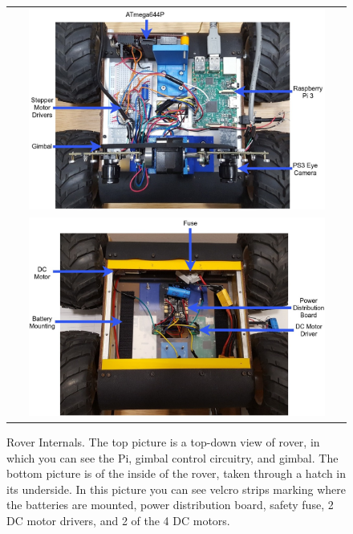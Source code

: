 \begin{figure}[H]
    \begin{center}
    \begin{tabular}{ c }
        \includegraphics[width=0.9\textwidth]{Figures/RoverAbove.jpg} \\
        \includegraphics[width=0.9\textwidth]{Figures/RoverInternals.jpg}
    \end{tabular}
    \caption[Rover Internals]{Rover Internals. The top picture is a top-down view of rover, in which you can see the Pi, gimbal control circuitry, and gimbal. The bottom picture is of the inside of the rover, taken through a hatch in its underside. In this picture you can see velcro strips marking where the batteries are mounted, power distribution board, safety fuse, 2 DC motor drivers, and 2 of the 4 DC motors.}
    \label{fig:internals}
    \end{center}
\end{figure}

